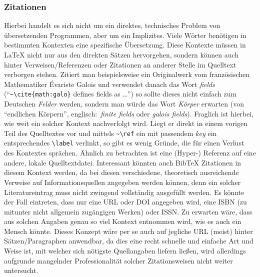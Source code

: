 \subsubsection{Zitationen}\par
Hierbei handelt es sich nicht um ein direktes, technisches Problem von übersetzenden Programmen, aber um ein Implizites. Viele Wörter benötigen in bestimmten Kontexten eine spezifische Übersetzung. Diese Kontexte müssen in \LaTeX{} nicht nur aus den direkten Sätzen hervorgehen, sondern können auch hinter Verweisen/Referenzen oder Zitationen an anderer Stelle im Quelltext verborgen stehen. Zitiert man beispielsweise ein Originalwerk vom französischen Mathematiker Évariste Galois und verwendet danach das Wort \textit{fields} (\enquote{{\verb|~\cite{math:galo}|} defines fields as \ldots}) so sollte dieses nicht einfach zum Deutschen \textit{Felder} werden, sondern man würde das Wort \textit{Körper} erwarten (von \enquote{endlichen Körpern}, englisch:\ \textit{finite fields} oder \textit{galois fields}).
Fraglich ist hierbei, wie weit ein solcher Kontext nachverfolgt wird. Liegt er direkt in einem vorigen Teil des Quelltextes vor und mittels \verb|~\ref| ein mit passendem \textit{key} ein entsprechendes \verb|\label| verlinkt, so gibt es wenig Gründe, die für einen Verlust des Kontextes sprächen. Ähnlich zu betrachten ist eine (Hyper-) Referenz auf eine andere, lokale Quelltextdatei. Interessant könnten auch Bib\TeX{} Zitationen in diesem Kontext werden, da bei diesen verschiedene, theoretisch ausreichende Verweise auf Informationsquellen angegeben werden können, denn ein solcher Literatureintrag muss nicht zwingend vollständig ausgefüllt werden. Es könnte der Fall eintreten, dass nur eine URL oder DOI angegeben wird, eine ISBN (zu mitunter nicht allgemein zugängigen Werken) oder ISSN. Zu erwarten wäre, dass aus solchen Angaben genau so viel Kontext entnommen wird, wie es auch ein Mensch könnte. Dieses Konzept wäre per se auch auf jegliche URL (meist) hinter Sätzen/Paragraphen anwendbar, da dies eine recht schnelle und einfache Art und Weise ist, mit welcher sich nötigste Quellangaben liefern ließen, wird allerdings aufgrunde mangelnder Professionalität solcher Zitationsweisen nicht weiter untersucht.



